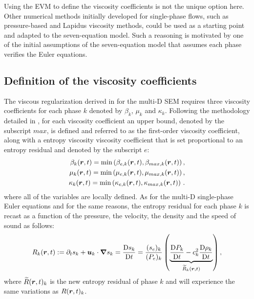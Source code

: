 Using the EVM to define the viscosity coefficients is not the unique option here. Other numerical methods initially developed for single-phase flows, such as pressure-based and Lapidus viscosity methods, could be used as a starting point and adapted to the seven-equation model. Such a reasoning is motivated by one of the initial assumptions of the seven-equation model that assumes each phase verifies the Euler equations.
\subsection{Definition of the viscosity coefficients}\label{sec:visc-coeff-sem}
The viscous regularization derived in  for the multi-D SEM requires three viscosity coefficients for each phase $k$ denoted by $\beta_k$, $\mu_k$ and $\kappa_k$. Following the methodology detailed in , for each viscosity coefficient an upper bound, denoted by the subscript $max$, is defined and referred to as the first-order viscosity coefficient, along with a entropy viscosity viscosity coefficient that is set proportional to an entropy residual and denoted by the subscript $e$:
%
\begin{align}\label{eq:def-visc-sem-sct4}
\beta_k( \boldsymbol r, t) = \min \left( \beta_{e,k}( \boldsymbol r, t), \beta_{max,k} ( \boldsymbol r, t) \right), \nonumber \\
\mu_k( \boldsymbol r, t) = \min \left( \mu_{e,k}( \boldsymbol r, t), \mu_{max,k} ( \boldsymbol r, t) \right), \nonumber \\
\kappa_k( \boldsymbol r, t) = \min \left( \kappa_{e,k}( \boldsymbol r, t), \kappa_{max,k} ( \boldsymbol r, t) \right) \,. \nonumber
\end{align}
% 
where all of the variables are locally defined. As for the multi-D single-phase Euler equations and for the same reasons, the entropy residual for each phase $k$ is recast as a function of the pressure, the velocity, the density and the speed of sound as follows:
%
\begin{equation}\label{eq:ent_res-sem-sct4}
R_k(\boldsymbol r,t) := \partial_t s_k + \boldsymbol u_k \cdot \boldsymbol{\nabla} s_k = \frac{\textrm{D} s_k}{\textrm{D} t} = \frac{(s_e)_k}{(P_e)_k} \left( \underbrace{\frac{\textrm{D} P_k}{\textrm{D} t} - c_k^2 \frac{\textrm{D} \rho_k}{\textrm{D} t} }_{\widetilde{R}_k(\boldsymbol r,t)} \right) ,
\end{equation} 
%
where $\widetilde{R}(\boldsymbol r,t)_k$ is the new entropy residual of phase $k$ and will experience the same variations as $R(\boldsymbol r,t)_k$. 

